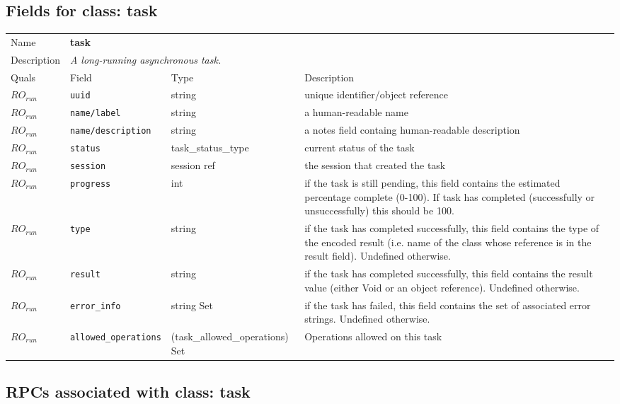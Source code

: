 \subsection{Fields for class: task}
\begin{longtable}{|lllp{}|}
\hline
\multicolumn{1}{|l}{Name} & \multicolumn{3}{l|}{\bf task} \\
\multicolumn{1}{|l}{Description} & \multicolumn{3}{l|}{\parbox{11cm}{\em A
long-running asynchronous task.}} \\
\hline
Quals & Field & Type & Description \\
\hline
$\mathit{RO}_\mathit{run}$ &  {\tt uuid} & string & unique identifier/object reference \\
$\mathit{RO}_\mathit{run}$ &  {\tt name/label} & string & a human-readable name \\
$\mathit{RO}_\mathit{run}$ &  {\tt name/description} & string & a notes field containg human-readable description \\
$\mathit{RO}_\mathit{run}$ &  {\tt status} & task\_status\_type & current status of the task \\
$\mathit{RO}_\mathit{run}$ &  {\tt session} & session ref & the session that created the task \\
$\mathit{RO}_\mathit{run}$ &  {\tt progress} & int & if the task is still pending, this field contains the estimated percentage complete (0-100). If task has completed (successfully or unsuccessfully) this should be 100. \\
$\mathit{RO}_\mathit{run}$ &  {\tt type} & string & if the task has completed successfully, this field contains the type of the encoded result (i.e. name of the class whose reference is in the result field). Undefined otherwise. \\
$\mathit{RO}_\mathit{run}$ &  {\tt result} & string & if the task has completed successfully, this field contains the result value (either Void or an object reference). Undefined otherwise. \\
$\mathit{RO}_\mathit{run}$ &  {\tt error\_info} & string Set & if the task has failed, this field contains the set of associated error strings. Undefined otherwise. \\
$\mathit{RO}_\mathit{run}$ &  {\tt allowed\_operations} & (task\_allowed\_operations) Set & Operations allowed on this task \\
\hline
\end{longtable}
\subsection{RPCs associated with class: task}
